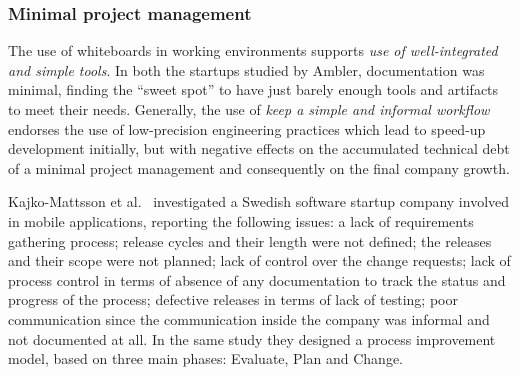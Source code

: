 \documentclass[10pt,journal,letterpaper,compsoc]{IEEEtran}
\begin{document}
\subsubsection{Minimal project management}

The use of whiteboards in working environments supports \textit{use of 
well-integrated and simple tools}. In both the startups studied by Ambler,
documentation was minimal, finding the ``sweet spot'' to have just barely enough
tools and artifacts to meet their needs. Generally, the use of \textit{keep a
simple and informal workflow} endorses the use of low-precision engineering
practices which lead to speed-up development initially, but with negative
effects on the accumulated technical debt of a minimal project management and
consequently on the final company growth.

Kajko-Mattsson et al.~\cite{Kajko-Mattsson2008} investigated a Swedish software
startup company involved in mobile applications, reporting the following issues:
a lack of requirements gathering process; release cycles and their length were
not defined; the releases and their scope were not planned; lack of control over
the change requests; lack of process control in terms of absence of any
documentation to track the status and progress of the process; defective
releases in terms of lack of testing; poor communication since the communication
inside the company was informal and not documented at all. In the same study
they designed a process improvement model, based on three main phases: Evaluate,
Plan and Change.
\end{document}
